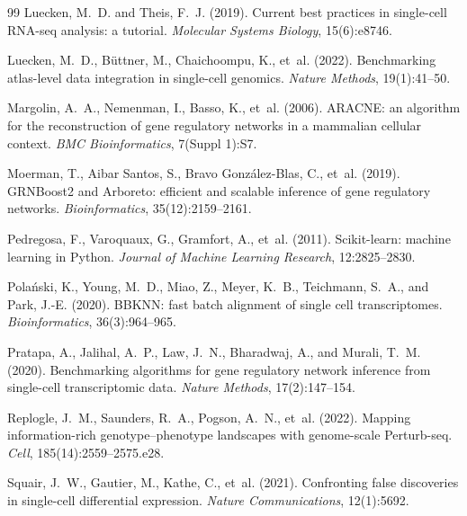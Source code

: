 \documentclass[unnumsec,webpdf,contemporary,large,namedate]{oup-authoring-template}
\begin{document}
\begin{thebibliography}{99}
Luecken, M.~D. and Theis, F.~J. (2019).
\newblock Current best practices in single-cell RNA-seq analysis: a tutorial.
\newblock \textit{Molecular Systems Biology}, 15(6):e8746.

Luecken, M.~D., B{\"u}ttner, M., Chaichoompu, K., et~al. (2022).
\newblock Benchmarking atlas-level data integration in single-cell genomics.
\newblock \textit{Nature Methods}, 19(1):41--50.

Margolin, A.~A., Nemenman, I., Basso, K., et~al. (2006).
\newblock ARACNE: an algorithm for the reconstruction of gene regulatory
  networks in a mammalian cellular context.
\newblock \textit{BMC Bioinformatics}, 7(Suppl 1):S7.

Moerman, T., Aibar Santos, S., Bravo Gonz{\'a}lez-Blas, C., et~al. (2019).
\newblock GRNBoost2 and Arboreto: efficient and scalable inference of gene
  regulatory networks.
\newblock \textit{Bioinformatics}, 35(12):2159--2161.

Pedregosa, F., Varoquaux, G., Gramfort, A., et~al. (2011).
\newblock Scikit-learn: machine learning in Python.
\newblock \textit{Journal of Machine Learning Research}, 12:2825--2830.

Pola{\'n}ski, K., Young, M.~D., Miao, Z., Meyer, K.~B., Teichmann, S.~A., and
  Park, J.-E. (2020).
\newblock BBKNN: fast batch alignment of single cell transcriptomes.
\newblock \textit{Bioinformatics}, 36(3):964--965.

Pratapa, A., Jalihal, A.~P., Law, J.~N., Bharadwaj, A., and Murali, T.~M.
  (2020).
\newblock Benchmarking algorithms for gene regulatory network inference from
  single-cell transcriptomic data.
\newblock \textit{Nature Methods}, 17(2):147--154.

Replogle, J.~M., Saunders, R.~A., Pogson, A.~N., et~al. (2022).
\newblock Mapping information-rich genotype--phenotype landscapes with
  genome-scale Perturb-seq.
\newblock \textit{Cell}, 185(14):2559--2575.e28.

Squair, J.~W., Gautier, M., Kathe, C., et~al. (2021).
\newblock Confronting false discoveries in single-cell differential expression.
\newblock \textit{Nature Communications}, 12(1):5692.


\end{thebibliography}
\end{document}
